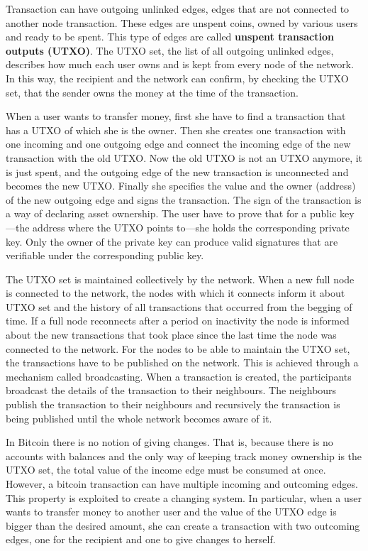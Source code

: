 Transaction can have outgoing unlinked edges, edges that are not connected to another node transaction. These edges are unspent coins, owned by various users and ready to be spent. This type of edges are called \textbf{unspent transaction outputs (UTXO)}. The UTXO set, the list of all outgoing unlinked edges, describes how much each user owns and is kept from every node of the network. In this way, the recipient and the network can confirm, by checking the UTXO set, that the sender owns the money at the time of the transaction.

When a user wants to transfer money, first she have to find a transaction that has a UTXO of which she is the owner. Then she creates one transaction with one incoming and one outgoing edge and connect the incoming edge of the new transaction with the old UTXO. Now the old UTXO is not an UTXO anymore, it is just spent, and the outgoing edge of the new transaction is unconnected and becomes the new UTXO. Finally she specifies the value and the owner (address) of the new outgoing edge and signs the transaction. The sign of the transaction is a way of declaring asset ownership. The user have to prove that for a public key---the address where the UTXO points to---she holds the corresponding private key. Only the owner of the private key can produce valid signatures that are verifiable under the corresponding public key.

The UTXO set is maintained collectively by the network. When a new full node is connected to the network, the nodes with which it connects inform it about UTXO set and the history of all transactions that occurred from the begging of time. If a full node reconnects after a period on inactivity the node is informed about the new transactions that took place since the last time the node was connected to the network. For the nodes to be able to maintain the UTXO set, the transactions have to be published on the network. This is achieved through a mechanism called broadcasting. When a transaction is created, the participants broadcast the details of the transaction to their neighbours. The neighbours publish the transaction to their neighbours and recursively the transaction is being published until the whole network becomes aware of it.

In Bitcoin there is no notion of giving changes. That is, because there is no accounts with balances and the only way of keeping track money ownership is the UTXO set, the total value of the income edge must be consumed at once. However, a bitcoin transaction can have multiple incoming and outcoming edges. This property is exploited to create a changing system. In particular, when a user wants to transfer money to another user and the value of the UTXO edge is bigger than the desired amount, she can create a transaction with two outcoming edges, one for the recipient and one to give changes to herself.


